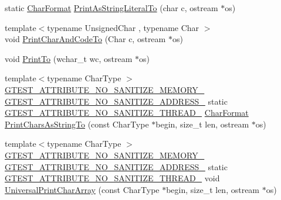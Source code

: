\begin{DoxyCompactItemize}
\item 
static \mbox{\hyperlink{namespacetesting_1_1internal_ae2ef98247c76a50cdc80ceb4a6c81793}{Char\+Format}} \mbox{\hyperlink{namespacetesting_1_1internal_a82e5b3cf45fd9c4603dbe14bc4cb38c2}{Print\+As\+String\+Literal\+To}} (char c, ostream $\ast$os)
\item 
{\footnotesize template$<$typename Unsigned\+Char , typename Char $>$ }\\void \mbox{\hyperlink{namespacetesting_1_1internal_a0c577e598e61d339ba45dd6643fb1969}{Print\+Char\+And\+Code\+To}} (Char c, ostream $\ast$os)
\item 
void \mbox{\hyperlink{namespacetesting_1_1internal_aa74ea9d64f76ce69eceb225ca5ebef58}{Print\+To}} (wchar\+\_\+t wc, ostream $\ast$os)
\item 
{\footnotesize template$<$typename Char\+Type $>$ }\\\mbox{\hyperlink{gtest-port_8h_a2a83dd79037e53814a509cc3f5702650}{G\+T\+E\+S\+T\+\_\+\+A\+T\+T\+R\+I\+B\+U\+T\+E\+\_\+\+N\+O\+\_\+\+S\+A\+N\+I\+T\+I\+Z\+E\+\_\+\+M\+E\+M\+O\+R\+Y\+\_\+}} \mbox{\hyperlink{gtest-port_8h_af18b465f4ba6e36eea7a8d2d79521873}{G\+T\+E\+S\+T\+\_\+\+A\+T\+T\+R\+I\+B\+U\+T\+E\+\_\+\+N\+O\+\_\+\+S\+A\+N\+I\+T\+I\+Z\+E\+\_\+\+A\+D\+D\+R\+E\+S\+S\+\_\+}} static \mbox{\hyperlink{gtest-port_8h_abf30a6b1b3a12ecb2cc1bc1a6f5f9646}{G\+T\+E\+S\+T\+\_\+\+A\+T\+T\+R\+I\+B\+U\+T\+E\+\_\+\+N\+O\+\_\+\+S\+A\+N\+I\+T\+I\+Z\+E\+\_\+\+T\+H\+R\+E\+A\+D\+\_\+}} \mbox{\hyperlink{namespacetesting_1_1internal_ae2ef98247c76a50cdc80ceb4a6c81793}{Char\+Format}} \mbox{\hyperlink{namespacetesting_1_1internal_aa74d42b9fdd837ae0af3044acc77aac9}{Print\+Chars\+As\+String\+To}} (const Char\+Type $\ast$begin, size\+\_\+t len, ostream $\ast$os)
\item 
{\footnotesize template$<$typename Char\+Type $>$ }\\\mbox{\hyperlink{gtest-port_8h_a2a83dd79037e53814a509cc3f5702650}{G\+T\+E\+S\+T\+\_\+\+A\+T\+T\+R\+I\+B\+U\+T\+E\+\_\+\+N\+O\+\_\+\+S\+A\+N\+I\+T\+I\+Z\+E\+\_\+\+M\+E\+M\+O\+R\+Y\+\_\+}} \mbox{\hyperlink{gtest-port_8h_af18b465f4ba6e36eea7a8d2d79521873}{G\+T\+E\+S\+T\+\_\+\+A\+T\+T\+R\+I\+B\+U\+T\+E\+\_\+\+N\+O\+\_\+\+S\+A\+N\+I\+T\+I\+Z\+E\+\_\+\+A\+D\+D\+R\+E\+S\+S\+\_\+}} static \mbox{\hyperlink{gtest-port_8h_abf30a6b1b3a12ecb2cc1bc1a6f5f9646}{G\+T\+E\+S\+T\+\_\+\+A\+T\+T\+R\+I\+B\+U\+T\+E\+\_\+\+N\+O\+\_\+\+S\+A\+N\+I\+T\+I\+Z\+E\+\_\+\+T\+H\+R\+E\+A\+D\+\_\+}} void \mbox{\hyperlink{namespacetesting_1_1internal_ad896a4e4d9133ce43dc18b6038d95dc3}{Universal\+Print\+Char\+Array}} (const Char\+Type $\ast$begin, size\+\_\+t len, ostream $\ast$os)

\end{DoxyCompactItemize}
